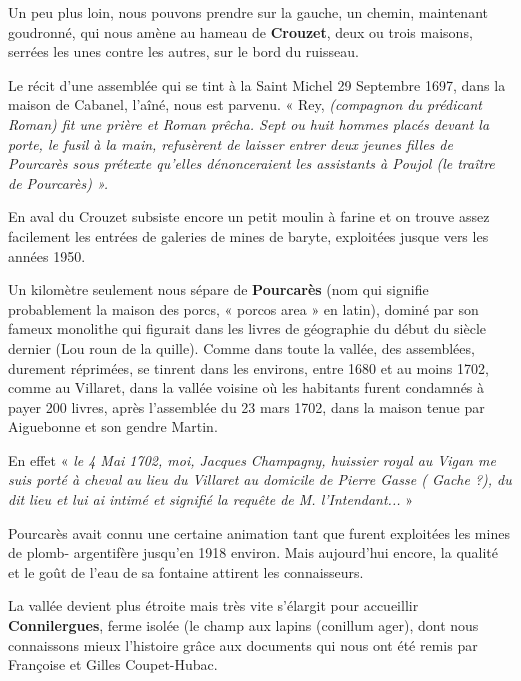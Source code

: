 
Un peu plus loin, nous pouvons prendre sur la gauche, un chemin, maintenant goudronné, qui
nous amène au hameau de \textbf{Crouzet}, deux ou trois maisons, serrées les unes contre les autres,
sur le bord du ruisseau.

Le récit d’une assemblée qui se tint à la Saint Michel 29 Septembre 1697, dans la maison de
Cabanel, l’aîné, nous est parvenu. « Rey, \textit{(compagnon du prédicant Roman) fit une prière et
Roman prêcha. Sept ou huit hommes placés devant la porte, le fusil à la main, refusèrent de
laisser entrer deux jeunes filles de Pourcarès sous prétexte qu’elles dénonceraient les
assistants à Poujol (le traître de Pourcarès) ».}

\vspace{0.2cm}

En aval du Crouzet subsiste encore un petit moulin à farine et on trouve assez facilement les
entrées de galeries de mines de baryte, exploitées jusque vers les années 1950.

\vspace{0.2cm}

Un kilomètre seulement nous sépare de \textbf{Pourcarès} (nom qui signifie probablement la maison
des porcs, « porcos area » en latin), dominé par son fameux monolithe qui figurait dans les
livres de géographie du début du siècle dernier (Lou roun de la quille). Comme dans toute la
vallée, des assemblées, durement réprimées, se tinrent dans les environs, entre 1680 et au
moins 1702, comme au Villaret, dans la vallée voisine où les habitants furent condamnés à
payer 200 livres, après l’assemblée du 23 mars 1702, dans la maison tenue par Aiguebonne et
son gendre Martin.

En effet « \textit{le 4 Mai 1702, moi, Jacques Champagny, huissier royal au Vigan me suis porté à
cheval au lieu du Villaret au domicile de Pierre Gasse ( Gache ?), du dit lieu et lui ai intimé
et signifié la requête de M. l’Intendant...} »

Pourcarès avait connu une certaine animation tant que furent exploitées les mines de plomb-
argentifère jusqu’en 1918 environ. Mais aujourd’hui encore, la qualité et le goût de l’eau de sa
fontaine attirent les connaisseurs.

\vspace{0.2cm}

La vallée devient plus étroite mais très vite s’élargit pour accueillir \textbf{Connilergues}, ferme
isolée (le champ aux lapins (conillum ager), dont nous connaissons mieux l’histoire grâce aux
documents qui nous ont été remis par Françoise et Gilles Coupet-Hubac.

